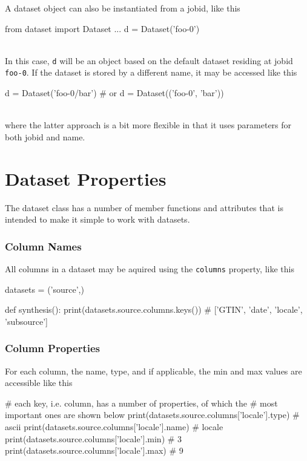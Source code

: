 A dataset object can also be instantiated from a jobid, like this

\begin{python}
from dataset import Dataset
...
d = Dataset('foo-0')
\end{python}
\\
In this case, \texttt{d} will be an object based on the default
dataset residing at jobid \texttt{foo-0}.  If the dataset is stored by
a different name, it may be accessed like this

\begin{python}
d = Dataset('foo-0/bar')
# or
d = Dataset(('foo-0', 'bar'))
\end{python}
\\
where the latter approach is a bit more flexible in that it uses
parameters for both jobid and name.




\newpage
\section{Dataset Properties}

The dataset class has a number of member functions and attributes that
is intended to make it simple to work with datasets.



\subsubsection{Column Names}

All columns in a dataset may be aquired using the \texttt{columns} property, like this

\begin{python}
datasets = ('source',)

def synthesis():
  print(datasets.source.columns.keys())
  # ['GTIN', 'date', 'locale', 'subsource']
\end{python}



\subsubsection{Column Properties}

For each column, the name, type, and if applicable, the min and max
values are accessible like this

\begin{python}
# each key, i.e. column, has a number of properties, of which the
# most important ones are shown below
print(datasets.source.columns['locale'].type)
# ascii
print(datasets.source.columns['locale'].name)
# locale
print(datasets.source.columns['locale'].min)
# 3
print(datasets.source.columns['locale'].max)
# 9
\end{python}

